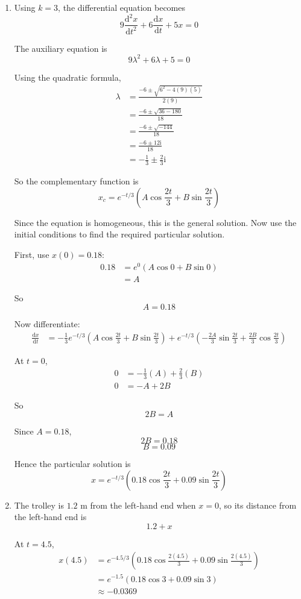 \documentclass[leqno]{article}
\begin{document}
\begin{enumerate}[
  label=\textbf{\arabic*.},
  leftmargin=*,
  topsep=0pt,
  partopsep=0pt,
  parsep=0pt
]
\begin{tcolorbox}[colback=white, colframe=scarlet, title={\textbf{Solution}}, breakable, grow to left by=6mm, grow to right by=10mm]
\begin{enumerate}[label=\textbf{(\alph*)}]
Hence, $k=3$.

  \item Using $k=3$, the differential equation becomes
\[
9\frac{\mathrm{d}^2x}{\mathrm{d}t^2}+6\frac{\mathrm{d}x}{\mathrm{d}t}+5x=0
\]

The auxiliary equation is
\[
9\lambda^2+6\lambda+5=0
\]

Using the quadratic formula,
\begin{align*}
\lambda
&=\frac{-6\pm\sqrt{6^2-4(9)(5)}}{2(9)}\\
&=\frac{-6\pm\sqrt{36-180}}{18}\\
&=\frac{-6\pm\sqrt{-144}}{18}\\
&=\frac{-6\pm 12\mathrm{i}}{18}\\
&=-\frac13\pm \frac23\mathrm{i}
\end{align*}

So the complementary function is
\[
x_c=e^{-t/3}\left(A\cos\frac{2t}{3}+B\sin\frac{2t}{3}\right)
\]

Since the equation is homogeneous, this is the general solution.  
Now use the initial conditions to find the required particular solution.

First, use $x(0)=0.18$:
\begin{align*}
0.18
&=e^0\left(A\cos 0+B\sin 0\right)\\
&=A
\end{align*}

So
\[
A=0.18
\]

Now differentiate:
\begin{align*}
\frac{\mathrm{d}x}{\mathrm{d}t}
&= -\frac13 e^{-t/3}\left(A\cos\frac{2t}{3}+B\sin\frac{2t}{3}\right)
+e^{-t/3}\left(-\frac{2A}{3}\sin\frac{2t}{3}+\frac{2B}{3}\cos\frac{2t}{3}\right)
\end{align*}

At $t=0$,
\begin{align*}
0
&= -\frac13(A)+\frac23(B)\\
0&=-A+2B
\end{align*}

So
\[
2B=A
\]

Since $A=0.18$,
\[
2B=0.18
\]
\[
B=0.09
\]

Hence the particular solution is
\[
x=e^{-t/3}\left(0.18\cos\frac{2t}{3}+0.09\sin\frac{2t}{3}\right)
\]

  \item The trolley is $1.2$ m from the left-hand end when $x=0$, so its distance from the left-hand end is
\[
1.2+x
\]

At $t=4.5$,
\begin{align*}
x(4.5)
&=e^{-4.5/3}\left(0.18\cos\frac{2(4.5)}{3}+0.09\sin\frac{2(4.5)}{3}\right)\\
&=e^{-1.5}\left(0.18\cos 3+0.09\sin 3\right)\\
&\approx -0.0369
\end{align*}


\end{enumerate}
\end{tcolorbox}
\end{enumerate}
\end{document}
